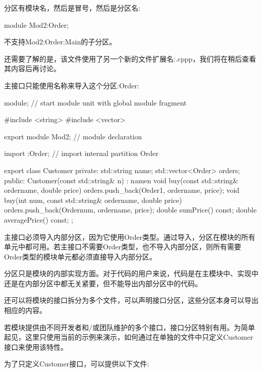 分区有模块名，然后是冒号，然后是分区名:

\begin{cpp}
module Mod2:Order;
\end{cpp}

不支持Mod2:Order:Main的子分区。

还需要了解的是，该文件使用了另一个新的文件扩展名:.cppp，我们将在稍后查看其内容后再讨论。

主接口只能使用名称来导入这个分区:Order:


\begin{cpp}
module; // start module unit with global module fragment

#include <string>
#include <vector>

export module Mod2; // module declaration

import :Order; // import internal partition Order

export class Customer {
private:
	std::string name;
	std::vector<Order> orders;
public:
	Customer(const std::string& n)
	: name{n} {
	}
	void buy(const std::string& ordername, double price) {
		orders.push_back(Order{1, ordername, price});
	}
	void buy(int num, const std::string& ordername, double price) {
		orders.push_back(Order{num, ordername, price});
	}
	double sumPrice() const;
	double averagePrice() const;
};
\end{cpp}

主接口必须导入内部分区，因为它使用Order类型。通过导入，分区在模块的所有单元中都可用。若主接口不需要Order类型，也不导入内部分区，则所有需要Order类型的模块单元都必须直接导入内部分区。

分区只是模块的内部实现方面。对于代码的用户来说，代码是在主模块中、实现中还是在内部分区中都无关紧要，但不能导出内部分区中的代码。


还可以将模块的接口拆分为多个文件，可以声明接口分区，这些分区本身可以导出相应的内容。

若模块提供由不同开发者和/或团队维护的多个接口，接口分区特别有用。为简单起见，这里只使用当前的示例来演示，如何通过在单独的文件中只定义Customer接口来使用该特性。

为了只定义Customer接口，可以提供以下文件:


